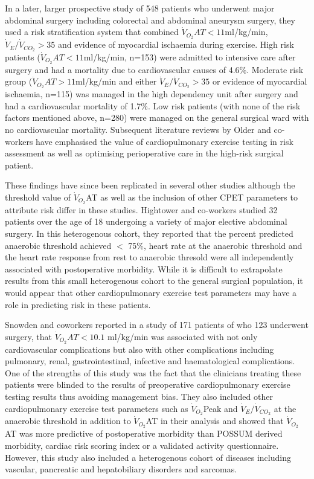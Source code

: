 In a later, larger prospective study of 548 patients who underwent major abdominal surgery including colorectal and abdominal aneurysm surgery, they used a risk stratification system that combined $\dot{V}_{O_2}AT<11$ml/kg/min, $\dot{V}_E/\dot{V}_{CO_2}>35$ and evidence of myocardial ischaemia during exercise. High risk patients ($\dot{V}_{O_2}AT<11$ml/kg/min, n=153) were admitted to intensive care after surgery and had a mortality due to cardiovascular causes of 4.6\%. Moderate risk group ($\dot{V}_{O_2}AT>11$ml/kg/min and either $\dot{V}_E/\dot{V}_{CO_2}>35$ or evidence of myocardial ischaemia, n=115) was managed in the high dependency unit after surgery and had a cardiovascular mortality of 1.7\%. Low risk patients (with none of the risk factors mentioned above, n=280) were managed on the general surgical ward with no cardiovascular mortality.\parencite{older_cardiopulmonary_1999} Subsequent literature reviews by Older and co-workers have emphasised the value of cardiopulmonary exercise testing in risk assessment as well as optimising perioperative care in the high-risk surgical patient. \parencite{older_preoperative_2000, older_clinical_2004, older_preoperative_2005}

These findings have since been replicated in several other studies although the threshold value of $\dot{V}_{O_2}$AT as well as the inclusion of other CPET parameters to attribute risk differ in these studies. Hightower and co-workers studied 32 patients over the age of 18 undergoing a variety of major elective abdominal surgery. In this heterogenous cohort, they reported that the percent predicted anaerobic threshold achieved $<$ 75\%, heart rate at the anaerobic threshold and the heart rate response from rest to anaerobic thresold were all independently associated with postoperative morbidity. While it is difficult to extrapolate results from this small heterogenous cohort to the general surgical population, it would appear that other cardiopulmonary exercise test parameters may have a role in predicting risk in these patients.\parencite{hightower_pilot_2010}

Snowden and coworkers reported in a study of 171 patients of who 123 underwent surgery, that $\dot{V}_{O_2}AT<10.1$ ml/kg/min was associated with not only cardiovascular complications but also with other complications including pulmonary, renal, gastrointestinal, infective and haematological complications. One of the strengths of this study was the fact that the clinicians treating these patients were blinded to the results of preoperative cardiopulmonary exercise testing results thus avoiding management bias. They also included other cardiopulmonary exercise test parameters such as $\dot{V}_{O_2}$Peak and $\dot{V}_E/\dot{V}_{CO_2}$ at the anaerobic threshold in addition to $\dot{V}_{O_2}$AT in their analysis and showed that $\dot{V}_{O_2}$AT was more predictive of postoperative morbidity than POSSUM derived morbidity, cardiac risk scoring index or a validated activity questionnaire. However, this study also included a heterogenous cohort of diseases including vascular, pancreatic and hepatobiliary disorders and sarcomas.\parencite{snowden_submaximal_2010}

